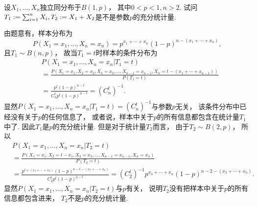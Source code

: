 \begin{example}
设\(X_1,\dotsc,X_n\)独立同分布于\(B(1,p)\)，
其中\(0<p<1,n>2\).
试问\(
	T_1 := \sum_{i=1}^n X_i,
	T_2 := X_1 + X_2
\)是不是参数\(p\)的充分统计量.
\begin{solution}
由题意有，样本分布为\begin{equation*}
	P(X_1=x_1,\dotsc,X_n=x_n)
	= p^{x_1+\dotsb+x_n}
	(1-p)^{n-(x_1+\dotsb+x_n)},
\end{equation*}
且\(T_1 \sim B(n,p)\)，
故当\(T_1 = t\)时样本的条件分布为\begin{align*}
	&P(X_1=x_1,\dotsc,X_n=x_n \vert T_1 = t) \\
	&= \frac{
		P\left(
			X_1=x_1,
			X_2=x_2,
			X_3=x_3,
			\dotsc,
			X_{n-1}=x_{n-1},
			X_n=t-(x_1+\dotsb+x_{n-1})
		\right)
	}{
		P(T_1=t)
	} \\
	&= \frac{p^t (1-p)^{n-t}}{C_n^t p^t (1-p)^{n-t}}
	= (C_n^t)^{-1}.
\end{align*}
显然\(P(X_1=x_1,\dotsc,X_n=x_n \vert T_1 = t) = (C_n^t)^{-1}\)与参数\(p\)无关，
该条件分布中已经没有关于\(p\)的任何信息了，
或者说，样本中关于\(p\)的所有信息都包含在统计量\(T_1\)中了.
因此\(T_1\)是\(p\)的充分统计量.
但是对于统计量\(T_2\)而言，
由于\(T_2 \sim B(2,p)\)，
所以\begin{align*}
	&P(X_1=x_1,\dotsc,X_n=x_n \vert T_2 = t) \\
	&= \frac{
		P\left(
			X_1=x_1,
			X_2=t-x_1,
			X_3=x_3,
			\dotsc,
			X_{n-1}=x_{n-1},
			X_n=x_n
		\right)
	}{
		P(T_2=t)
	} \\
	&= \frac{
		p^{t+(x_3+\dotsb+x_n)}
		(1-p)^{n-t-(x_3+\dotsb+x_n)}
	}{
		C_2^t p^t (1-p)^{2-t}
	}
	= (C_2^t)^{-1} p^{x_3+\dotsb+x_n} (1-p)^{n-2-(x_3+\dotsb+x_n)}.
\end{align*}
显然\(P(X_1=x_1,\dotsc,X_n=x_n \vert T_2 = t)\)与\(p\)有关，
说明\(T_2\)没有把样本中关于\(p\)的所有信息都包含进来，
\(T_2\)不是\(p\)的充分统计量.
\end{solution}
\end{example}
